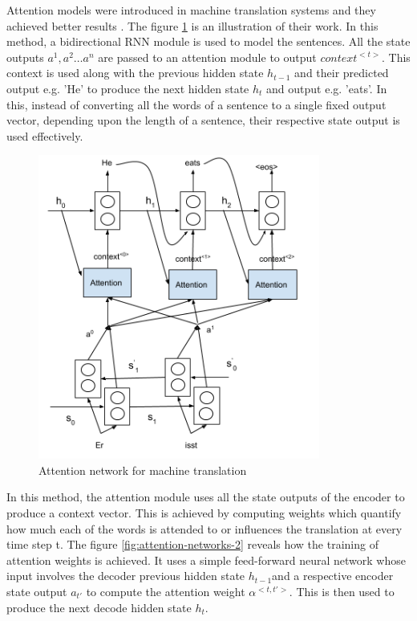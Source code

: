 \documentclass[a4paper, 11pt]{article}
\begin{document}
Attention models were introduced in machine translation systems and they achieved better results \parencite{bahdanau2014neural}. The figure \ref{fig:attention-networks-1} is an illustration of their work. In this method, a bidirectional RNN module is used to model the sentences. All the state outputs $a^1, a^2 \dots a^n$ are passed to an attention module to output $context^{<t>}$. This context is used along with the previous hidden state $h_{t-1}$ and their predicted output e.g. 'He' to produce the next hidden state $h_t$ and output e.g. 'eats'. In this, instead of converting all the words of a sentence to a single fixed output vector, depending upon the length of a sentence, their respective state output is used effectively. 

\begin{figure}[H]
    \centering
    \includegraphics[width=\textwidth,height=10cm,keepaspectratio=true]
    {attention-networks-1.png}
    \caption{
        Attention network for machine translation 
    }
    \label{fig:attention-networks-1}
\end{figure}


In this method, the attention module uses all the state outputs of the encoder to produce a context vector. This is achieved by computing weights which quantify how much each of the words is attended to or influences the translation at every time step t.  The figure \ref{fig:attention-networks-2} reveals how the training of attention weights is achieved. It uses a simple feed-forward neural network whose input involves the decoder previous hidden state $h_{t-1}$and a respective encoder state output $a_{t'}$ to compute the attention weight $\alpha^{<t,t'>}$. This is then used to produce the next decode hidden state $h_t$. 
\end{document}
